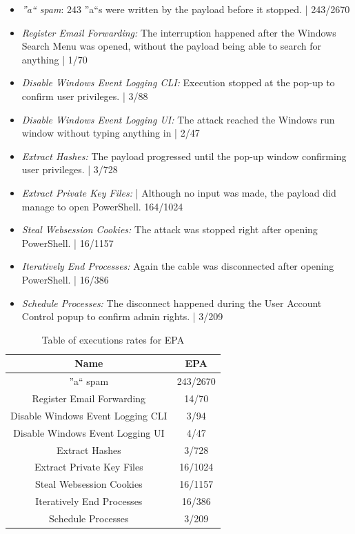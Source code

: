 \begin{itemize}
    \item  \emph{''a`` spam}: 243 ''a``s were written by the payload before it stopped. | 243/2670
    \item  \emph{Register Email Forwarding:} The interruption happened after the Windows Search Menu was opened, without the payload being able to search for anything  |  1/70 
    \item  \emph{Disable Windows Event Logging CLI:}  Execution stopped at the pop-up to confirm user privileges. | 3/88
    \item  \emph{Disable Windows Event Logging UI:} The attack reached the Windows run window without typing anything in | 2/47
    \item  \emph{Extract Hashes:}  The payload progressed until the pop-up window confirming user privileges. | 3/728 
    \item  \emph{Extract Private Key Files:}  | Although no input was made, the payload did manage to open PowerShell. 164/1024
    \item  \emph{Steal Websession Cookies:} The attack was stopped right after opening PowerShell. | 16/1157
    \item  \emph{Iteratively End Processes:} Again the cable was disconnected after opening PowerShell. | 16/386
    \item  \emph{Schedule Processes:} The disconnect happened during the User Account Control popup to confirm admin rights. | 3/209
\end{itemize}

\begin{table}[h]
\centering
\begin{tabular}{|c|c|}
\hline
Name & EPA  \\
\hline
''a`` spam & 243/2670 \\
\hline
Register Email Forwarding & 14/70 \\
\hline
Disable Windows Event Logging CLI & 3/94 \\
\hline
Disable Windows Event Logging UI & 4/47 \\
\hline
Extract Hashes & 3/728  \\
\hline
Extract Private Key Files & 16/1024 \\
\hline
Steal Websession Cookies & 16/1157 \\
\hline
Iteratively End Processes & 16/386 \\
\hline
Schedule Processes & 3/209 \\
\hline
\end{tabular}
\caption{Table of executions rates for EPA}
\label{table:EPA_results}
\end{table}

